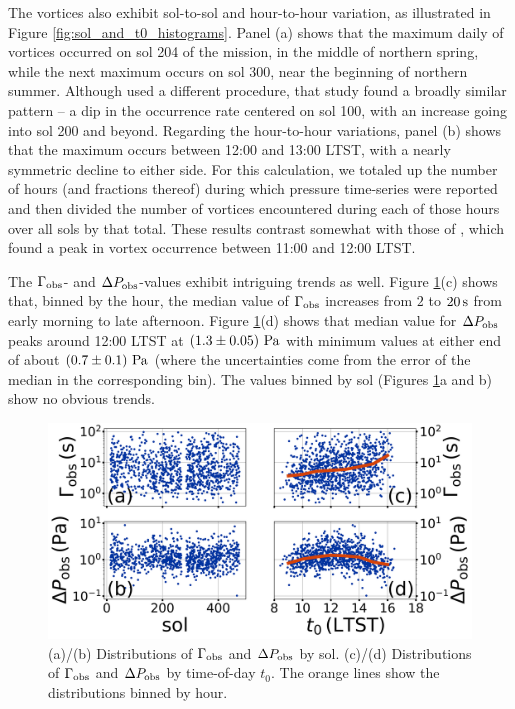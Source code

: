 \documentclass{aastex63}
\begin{document}
The vortices also exhibit sol-to-sol and hour-to-hour variation, as illustrated in Figure \ref{fig:sol_and_t0_histograms}. Panel (a) shows that the maximum daily of vortices occurred on sol 204 of the mission, in the middle of northern spring, while the next maximum occurs on sol 300, near the beginning of northern summer. Although \citet{2020arXiv200501134S} used a different procedure, that study found a broadly similar pattern -- a dip in the occurrence rate centered on sol 100, with an increase going into sol 200 and beyond. Regarding the hour-to-hour variations, panel (b) shows that the maximum occurs between 12:00 and 13:00 LTST, with a nearly symmetric decline to either side. For this calculation, we totaled up the number of hours (and fractions thereof) during which pressure time-series were reported and then divided the number of vortices encountered during each of those hours over all sols by that total. These results contrast somewhat with those of \citet{2020arXiv200501134S}, which found a peak in vortex occurrence between 11:00 and 12:00 LTST. 

The $\Gamma_{\rm obs}$- and $\Delta P_{\rm obs}$-values exhibit intriguing trends as well. Figure \ref{fig:Gammaobs_DeltaPobs_vs_TOD_and_sol}(c) shows that, binned by the hour, the median value of $\Gamma_{\rm obs}$ increases from $2$ to $20\,{\rm s}$ from early morning to late afternoon. Figure \ref{fig:Gammaobs_DeltaPobs_vs_TOD_and_sol}(d) shows that median value for $\Delta P_{\rm obs}$ peaks around 12:00 LTST at $\left( 1.3\pm0.05 \right)\,{\rm Pa}$ with minimum values at either end of about $\left( 0.7\pm 0.1 \right)\,{\rm Pa}$ (where the uncertainties come from the error of the median in the corresponding bin). The values binned by sol (Figures \ref{fig:Gammaobs_DeltaPobs_vs_TOD_and_sol}a and b) show no obvious trends. 

\begin{figure}
    \centering
    \includegraphics[width=\textwidth]{figures/Gammaobs_DeltaPobs_vs_TOD_and_sol.png}
    \caption{(a)/(b) Distributions of $\Gamma_{\rm obs}$ and $\Delta P_{\rm obs}$ by sol. (c)/(d) Distributions of $\Gamma_{\rm obs}$ and $\Delta P_{\rm obs}$ by time-of-day $t_0$. The orange lines show the distributions binned by hour.}
    \label{fig:Gammaobs_DeltaPobs_vs_TOD_and_sol}
\end{figure}
\end{document}
